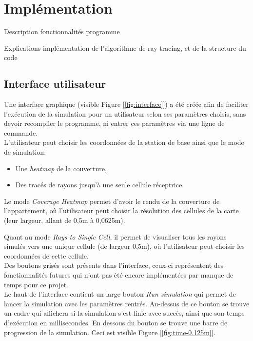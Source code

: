 \chapter{Implémentation}
\label{chaper-2}

Description fonctionnalités programme

Explications implémentation de l'algorithme de ray-tracing, et de la structure du code


\section{Interface utilisateur}
Une interface graphique (visible Figure [\ref{fig:interface}]) a été créée afin de faciliter l'exécution de la simulation pour un utilisateur selon ses paramètres choisis, sans devoir recompiler le programme, ni entrer ces paramètres via une ligne de commande.\\

L'utilisateur peut choisir les coordonnées de la station de base ainsi que le mode de simulation:
\begin{itemize}
    \item Une \textit{heatmap} de la couverture,
    \item Des tracés de rayons jusqu'à une seule cellule réceptrice.
\end{itemize}

Le mode \textit{Coverage Heatmap} permet d'avoir le rendu de la couverture de l'appartement, où l'utilisateur peut choisir la résolution des cellules de la carte (leur largeur, allant de 0,5m à 0,0625m).

Quant au mode \textit{Rays to Single Cell}, il permet de visualiser tous les rayons simulés vers une unique cellule (de largeur 0,5m), où l'utilisateur peut choisir les coordonnées de cette cellule.\\

Des boutons grisés sont présents dans l'interface, ceux-ci représentent des fonctionnalités futures qui n'ont pas été encore implémentées par manque de temps pour ce projet.\\

Le haut de l'interface contient un large bouton \textit{Run simulation} qui permet de lancer la simulation avec les paramètres rentrés. Au-dessus de ce bouton se trouve un cadre qui affichera si la simulation s'est finie avec succès, ainsi que son temps d'exécution en millisecondes. En dessous du bouton se trouve une barre de progression de la simulation. Ceci est visible Figure [\ref{fig:time-0.125m}].\\

